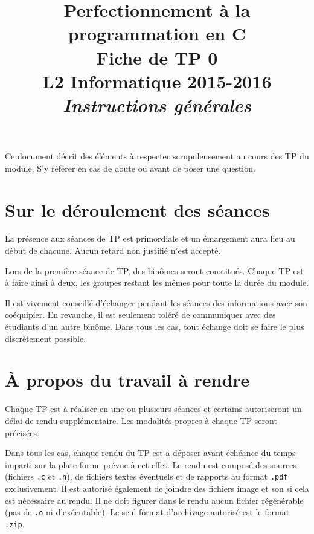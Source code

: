 \documentclass[12pt]{article}
\date{}
\title{{\bf Perfectionnement à la programmation en {\sf C}} \\
    Fiche de TP 0 \\
    {\small L2 Informatique 2015-2016} \\
    {\it \small Instructions générales}}
\theoremstyle{definition}
\begin{document}
\maketitle

Ce document décrit des éléments à respecter scrupuleusement au cours
des TP du module. S'y référer en cas de doute ou avant de poser une
question.
\medskip

\section{Sur le déroulement des séances}
La présence aux séances de TP est primordiale et un émargement aura lieu
au début de chacune. Aucun retard non justifié n'est accepté.
\smallskip

Lors de la première séance de TP, des binômes seront constitués. Chaque
TP est à faire ainsi à deux, les groupes restant les mêmes pour toute la
durée du module.
\smallskip

Il est vivement conseillé d'échanger pendant les séances des informations
avec son coéquipier. En revanche, il est seulement toléré de communiquer
avec des étudiants d'un autre binôme. Dans tous les cas, tout échange 
doit se faire le plus discrètement possible.
\medskip

\section{À propos du travail à rendre}
Chaque TP est à réaliser en une ou plusieurs séances et certains 
autoriseront un délai de rendu supplémentaire. Les modalités propres à
chaque TP seront précisées.
\smallskip

Dans tous les cas, chaque rendu du TP est a déposer avant échéance du 
temps imparti sur la plate-forme prévue à cet effet. Le rendu est 
composé des sources (fichiers {\tt .c} et {\tt .h}), de fichiers textes 
éventuels et de rapports au format {\tt .pdf} exclusivement. Il est 
autorisé également de joindre des fichiers image et son si cela est 
nécessaire au rendu. Il ne doit figurer dans le rendu aucun fichier 
régénérable (pas de {\tt .o} ni d'exécutable). Le seul format d'archivage 
autorisé est le format {\tt .zip}.
\medskip
\end{document}
